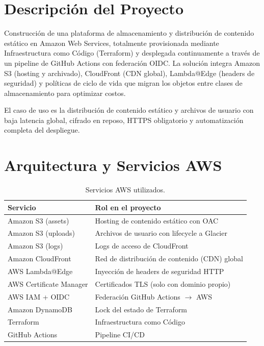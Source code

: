 \documentclass[12pt,a4paper]{report}
\begin{document}
\section{Descripción del Proyecto}

Construcción de una plataforma de almacenamiento y distribución de contenido estático en Amazon Web Services, totalmente provisionada mediante Infraestructura como Código (Terraform) y desplegada continuamente a través de un pipeline de GitHub Actions con federación OIDC. La solución integra Amazon S3 (hosting y archivado), CloudFront (CDN global), Lambda@Edge (headers de seguridad) y políticas de ciclo de vida que migran los objetos entre clases de almacenamiento para optimizar costos.

El caso de uso es la distribución de contenido estático y archivos de usuario con baja latencia global, cifrado en reposo, HTTPS obligatorio y automatización completa del despliegue.

\section{Arquitectura y Servicios AWS}

\begin{table}[H]
    \centering
    \caption{Servicios AWS utilizados.}
    \begin{tabular}{ll}
        \toprule
        \textbf{Servicio} & \textbf{Rol en el proyecto} \\
        \midrule
        Amazon S3 (assets)       & Hosting de contenido estático con OAC \\
        Amazon S3 (uploads)      & Archivos de usuario con lifecycle a Glacier \\
        Amazon S3 (logs)         & Logs de acceso de CloudFront \\
        Amazon CloudFront        & Red de distribución de contenido (CDN) global \\
        AWS Lambda@Edge          & Inyección de headers de seguridad HTTP \\
        AWS Certificate Manager  & Certificados TLS (solo con dominio propio) \\
        AWS IAM + OIDC           & Federación GitHub Actions $\rightarrow$ AWS \\
        Amazon DynamoDB          & Lock del estado de Terraform \\
        Terraform                & Infraestructura como Código \\
        GitHub Actions           & Pipeline CI/CD \\
        \bottomrule
    \end{tabular}
\end{table}
\end{document}
